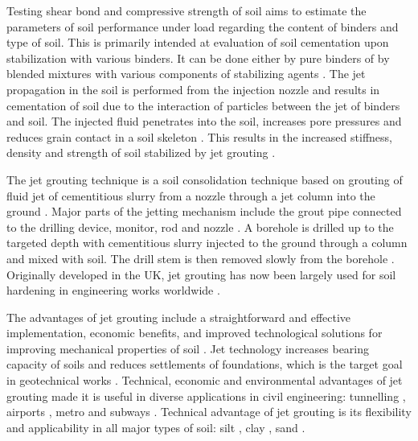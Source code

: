 \documentclass[USenglish,twocolumn]{article}
\begin{document}
Testing shear bond and compressive strength of soil aims to estimate the parameters of soil performance under load regarding the content of binders and type of soil. This is primarily intended at evaluation of soil cementation upon stabilization with various binders. It can be done either by pure binders of by blended mixtures with various components of stabilizing agents \citep{HOV2022101162,Bakaiyang}. The jet propagation in the soil is performed from the injection nozzle and results in cementation of soil due to the interaction of particles between the jet of binders and soil. The injected fluid penetrates into the soil, increases pore pressures and reduces grain contact in a soil skeleton \cite{Modonietal2006,Croceetal2014}. This results in the increased stiffness, density and strength of soil stabilized by jet grouting \cite{Modonietal2019}.

The jet grouting technique is a soil consolidation technique based on grouting of fluid jet of cementitious slurry from a nozzle through a jet column into the ground \cite{Mosiici}. Major parts of the jetting mechanism include the grout pipe connected to the drilling device, monitor, rod and nozzle \cite{CovilSkinner}. A borehole is drilled up to the targeted depth with cementitious slurry injected to the ground through a column and mixed with soil. The drill stem is then removed slowly from the borehole \cite{Njock}. Originally developed in the UK, jet grouting has now been largely used for soil hardening in engineering works worldwide \cite{Morey,Yoshida,Lunardi}. 

The advantages of jet grouting include a straightforward and effective implementation, economic benefits, and improved technological solutions for improving mechanical properties of soil \cite{modoni2012analysis}. Jet technology increases bearing capacity of soils and reduces settlements of foundations, which is the target goal in geotechnical works \cite{ModoniBzowka}. Technical, economic and environmental advantages of jet grouting \cite{Pinto} made it is useful in diverse applications in civil engineering: tunnelling \cite{Croce}, airports \cite{Hamidi,Lewis}, metro and subways \cite{Farretal2012,Chuetal,Mihalis}. Technical advantage of jet grouting is its flexibility \cite{Newman} and applicability in all major types of soil: silt \cite{Chuetal2012,HoHu}, clay \cite{Hoetal2005,Ho2009}, sand \cite{Hanetal2012}.
\end{document}
